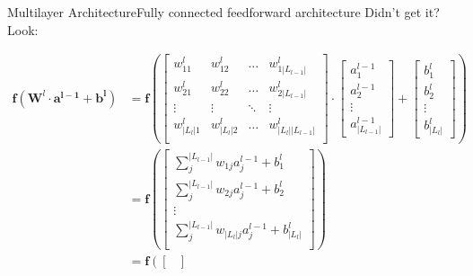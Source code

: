 \documentclass{beamer}
\begin{document}
        \begin{frame}{Multilayer Architecture}{Fully connected feedforward architecture}
                Didn't get it? Look: 

                {\tiny
                \begin{align*}
                    \mathbf{f}\left( \mathbf{W}^l \cdot \mathbf{a^{l-1}} + \mathbf{b^l} \right) &=
                    \mathbf{f} \left( \begin{bmatrix}
                        w^l_{11} & w^l_{12} & \ldots & w^l_{1|L_{l-1}|}\\
                        w^l_{21} & w^l_{22} & \ldots & w^l_{2|L_{l-1}|}\\
                        \vdots & \vdots & \ddots & \vdots\\
                        w^l_{|L_l|1} & w^l_{|L_l|2} & \ldots & w^l_{|L_l||L_{l-1}|}\\
                    \end{bmatrix}
                    \cdot
                    \begin{bmatrix}
                        a^{l-1}_1 \\ a^{l-1}_2  \\ \vdots  \\ a^{l-1}_{|L_{l-1}|}
                    \end{bmatrix}
                    +
                    \begin{bmatrix}
                        b^{l}_1 \\ b^{l}_2  \\ \vdots  \\ b^{l}_{|L_l|}
                    \end{bmatrix}
                    \right)\\
                    & =
                    \mathbf{f}\left( \begin{bmatrix}
                        \sum_j^{|L_{l-1}|} w_{1j}a^{l-1}_j + b^l_1\\
                        \sum_j^{|L_{l-1}|} w_{2j}a^{l-1}_j + b^l_2\\
                        \vdots\\
                        \sum_j^{|L_{l-1}|} w_{|L_l|j}a^{l-1}_j + b^l_{|L_l|}\\
                    \end{bmatrix} \right)\\
                    & = 
                    \mathbf{f} \left( \begin{bmatrix}

\end{bmatrix}
\end{align*}}
\end{frame}
\end{document}
